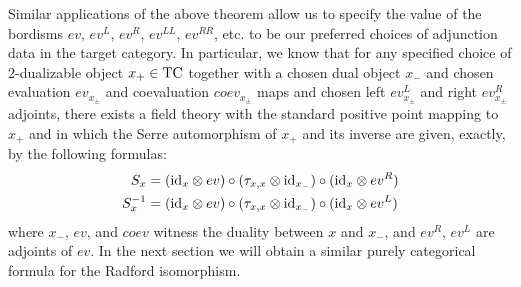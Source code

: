 \documentclass{amsart}
\begin{document}
Similar applications of the above theorem allow us to specify the value of the bordisms $ev$, $ev^L$, $ev^R$, $ev^{LL}$, $ev^{RR}$, etc. to be our preferred choices of adjunction data in the target category.  In particular, we know that for any specified choice of $2$-dualizable object $x_+ \in \mathrm{TC}$ together with a chosen dual object $x_-$ and chosen evaluation $ev_{x_\pm}$ and coevaluation $coev_{x_\pm}$ maps and chosen left $ev_{x_\pm}^L$ and right $ev_{x_\pm}^R$ adjoints, there exists a field theory with the standard positive point mapping to $x_+$ and in which the Serre automorphism of $x_+$ and its inverse are given, exactly, by the following formulas:
	\begin{align*}
		S_x &= (\mathrm{id}_{x} \otimes ev) \circ (\tau_{x, x} \otimes \mathrm{id}_{x_-}) \circ (\mathrm{id}_{x} \otimes ev^R) \\
		S_x^{-1} &= (\mathrm{id}_{x} \otimes ev) \circ (\tau_{x, x} \otimes \mathrm{id}_{x_-}) \circ (\mathrm{id}_{x} \otimes ev^L)
	\end{align*}
	where $x_-$, $ev$, and $coev$ witness the duality between $x$ and $x_-$, and $ev^R$, $ev^L$ are adjoints of $ev$.
In the next section we will obtain a similar purely categorical formula for the Radford isomorphism. 
 
\end{document}
